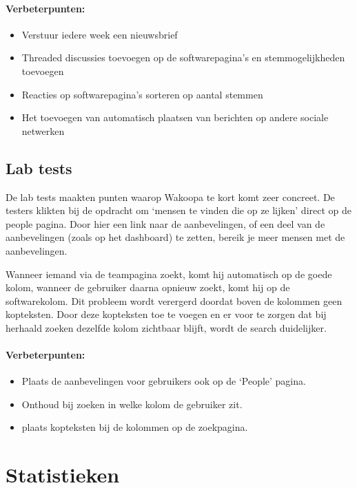 \documentclass[a4paper, 10pt, pdftex]{report}
\begin{document}
      \paragraph{\textbf{Verbeterpunten:}}
      \begin{itemize}
        \item Verstuur iedere week een nieuwsbrief
        \item Threaded discussies toevoegen op de softwarepagina's en stemmogelijkheden toevoegen
        \item Reacties op softwarepagina's sorteren op aantal stemmen
        \item Het toevoegen van automatisch plaatsen van berichten op andere sociale netwerken
      \end{itemize}

      \subsection{Lab tests}
        De lab tests maakten punten waarop Wakoopa te kort komt zeer concreet. De testers klikten bij de opdracht om `mensen te vinden die op ze lijken' direct op de people pagina. Door hier een link naar de aanbevelingen, of een deel van de aanbevelingen (zoals op het dashboard) te zetten, bereik je meer mensen met de aanbevelingen.

        Wanneer iemand via de teampagina zoekt, komt hij automatisch op de goede kolom, wanneer de gebruiker daarna opnieuw zoekt, komt hij op de softwarekolom. Dit probleem wordt verergerd doordat boven de kolommen geen kopteksten. Door deze kopteksten toe te voegen en er voor te zorgen dat bij herhaald zoeken dezelfde kolom zichtbaar blijft, wordt de search duidelijker.

      \paragraph{\textbf{Verbeterpunten:}}
      \begin{itemize}
        \item Plaats de aanbevelingen voor gebruikers ook op de `People' pagina.
        \item Onthoud bij zoeken in welke kolom de gebruiker zit.
        \item plaats kopteksten bij de kolommen op de zoekpagina.
      \end{itemize}

    \section{Statistieken}
\end{document}
